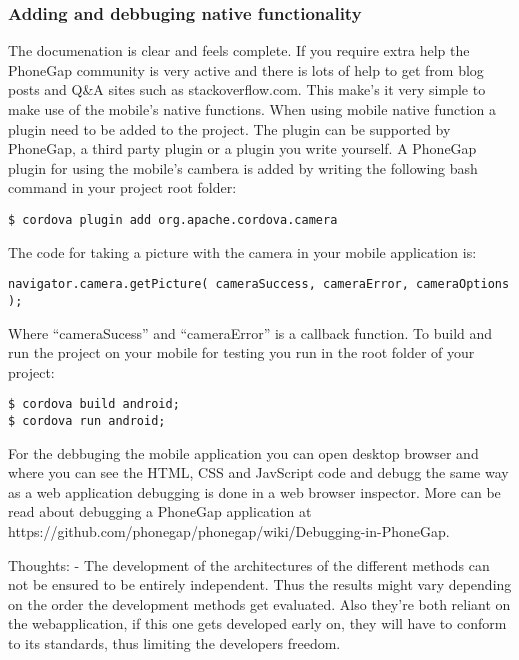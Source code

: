 \subsubsection{Adding and debbuging native functionality}
The documenation is clear and feels complete. If you require extra help the PhoneGap community is very active and there is lots of help to get from blog posts and Q\&A sites such as stackoverflow.com. This make’s it very simple to make use of the mobile’s native functions. 
\newline
\newline
When using mobile native function a plugin need to be added to the project. The plugin can be supported by PhoneGap, a third party plugin or a plugin you write yourself. A PhoneGap plugin for using the mobile’s cambera is added by writing the following bash command in your project root folder:
\begin{verbatim}
$ cordova plugin add org.apache.cordova.camera
\end{verbatim}
The code for taking a picture with the camera in your mobile application is:
\begin{verbatim}
navigator.camera.getPicture( cameraSuccess, cameraError, cameraOptions );
\end{verbatim}
Where “cameraSucess” and “cameraError” is a callback function. 
\newline
\newline
To build and run the project on your mobile for testing you run in the root folder of your project:
\begin{verbatim}
$ cordova build android; 
$ cordova run android;
\end{verbatim}

For the debbuging the mobile application you can open desktop browser and where you can see the HTML, CSS and JavScript code and debugg the same way as a web application debugging is done in a web browser inspector. More can be read about debugging a PhoneGap application at https://github.com/phonegap/phonegap/wiki/Debugging-in-PhoneGap.  



Thoughts:
 - The development of the architectures of the different methods can not be ensured to be entirely independent. Thus the results might vary depending on the order the development methods get evaluated. Also they're both reliant on the webapplication, if this one gets developed early on, they will have to conform to its standards, thus limiting the developers freedom. 

